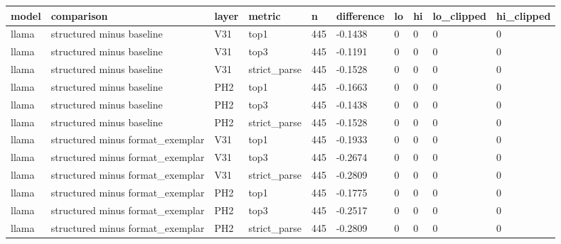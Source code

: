 \begin{tabular}{llllllllll}
\toprule
model & comparison & layer & metric & n & difference & lo & hi & lo\_clipped & hi\_clipped \\
\midrule
llama & structured minus baseline & V31 & top1 & 445 & -0.1438 & 0 & 0 & 0 & 0 \\
llama & structured minus baseline & V31 & top3 & 445 & -0.1191 & 0 & 0 & 0 & 0 \\
llama & structured minus baseline & V31 & strict\_parse & 445 & -0.1528 & 0 & 0 & 0 & 0 \\
llama & structured minus baseline & PH2 & top1 & 445 & -0.1663 & 0 & 0 & 0 & 0 \\
llama & structured minus baseline & PH2 & top3 & 445 & -0.1438 & 0 & 0 & 0 & 0 \\
llama & structured minus baseline & PH2 & strict\_parse & 445 & -0.1528 & 0 & 0 & 0 & 0 \\
llama & structured minus format\_exemplar & V31 & top1 & 445 & -0.1933 & 0 & 0 & 0 & 0 \\
llama & structured minus format\_exemplar & V31 & top3 & 445 & -0.2674 & 0 & 0 & 0 & 0 \\
llama & structured minus format\_exemplar & V31 & strict\_parse & 445 & -0.2809 & 0 & 0 & 0 & 0 \\
llama & structured minus format\_exemplar & PH2 & top1 & 445 & -0.1775 & 0 & 0 & 0 & 0 \\
llama & structured minus format\_exemplar & PH2 & top3 & 445 & -0.2517 & 0 & 0 & 0 & 0 \\
llama & structured minus format\_exemplar & PH2 & strict\_parse & 445 & -0.2809 & 0 & 0 & 0 & 0 \\
\bottomrule
\end{tabular}

